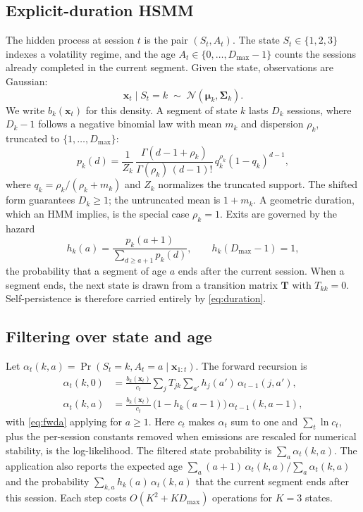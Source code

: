 \documentclass[conference]{IEEEtran}
\newcommand{\Dmax}{D_{\max}}
\newcommand{\Normal}{\mathcal{N}}
\begin{document}
\subsection{Explicit-duration HSMM}
The hidden process at session $t$ is the pair $(S_t, A_t)$. The state $S_t\in\{1,2,3\}$ indexes a volatility regime, and the age $A_t\in\{0,\dots,\Dmax-1\}$ counts the sessions already completed in the current segment. Given the state, observations are Gaussian:
\begin{equation}
\mathbf{x}_t \mid S_t=k \;\sim\; \Normal(\boldsymbol\mu_k, \boldsymbol\Sigma_k).
\label{eq:emission}
\end{equation}
We write $b_k(\mathbf{x}_t)$ for this density. A segment of state $k$ lasts $D_k$ sessions, where $D_k-1$ follows a negative binomial law with mean $m_k$ and dispersion $\rho_k$, truncated to $\{1,\dots,\Dmax\}$:
\begin{equation}
p_k(d)=\frac{1}{Z_k}\,\frac{\Gamma(d-1+\rho_k)}{\Gamma(\rho_k)\,(d-1)!}\,q_k^{\rho_k}(1-q_k)^{d-1},
\label{eq:duration}
\end{equation}
where $q_k=\rho_k/(\rho_k+m_k)$ and $Z_k$ normalizes the truncated support. The shifted form guarantees $D_k\geq 1$; the untruncated mean is $1+m_k$. A geometric duration, which an HMM implies, is the special case $\rho_k=1$. Exits are governed by the hazard
\begin{equation}
h_k(a)=\frac{p_k(a+1)}{\sum_{d\geq a+1}p_k(d)},\qquad h_k(\Dmax-1)=1,
\label{eq:hazard}
\end{equation}
the probability that a segment of age $a$ ends after the current session. When a segment ends, the next state is drawn from a transition matrix $\mathbf{T}$ with $T_{kk}=0$. Self-persistence is therefore carried entirely by \eqref{eq:duration}.

\subsection{Filtering over state and age}
Let $\alpha_t(k,a)=\Pr(S_t=k, A_t=a\mid \mathbf{x}_{1:t})$. The forward recursion is
\begin{align}
\alpha_t(k,0) &= \frac{b_k(\mathbf{x}_t)}{c_t}\sum_{j} T_{jk}\sum_{a'} h_j(a')\,\alpha_{t-1}(j,a'), \label{eq:fwd0}\\
\alpha_t(k,a) &= \frac{b_k(\mathbf{x}_t)}{c_t}\,\big(1-h_k(a-1)\big)\,\alpha_{t-1}(k,a-1), \label{eq:fwda}
\end{align}
with \eqref{eq:fwda} applying for $a\geq 1$. Here $c_t$ makes $\alpha_t$ sum to one and $\sum_t \ln c_t$, plus the per-session constants removed when emissions are rescaled for numerical stability, is the log-likelihood. The filtered state probability is $\sum_a \alpha_t(k,a)$. The application also reports the expected age $\sum_a (a+1)\,\alpha_t(k,a)/\sum_a \alpha_t(k,a)$ and the probability $\sum_{k,a} h_k(a)\,\alpha_t(k,a)$ that the current segment ends after this session. Each step costs $O(K^2+K\Dmax)$ operations for $K=3$ states.
\end{document}
